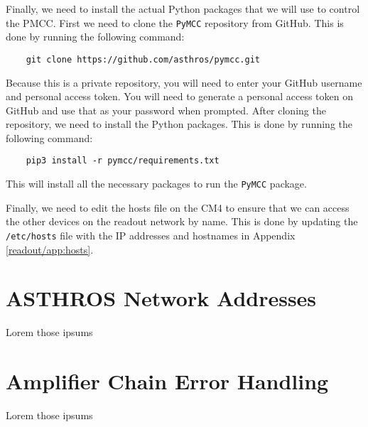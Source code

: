 Finally, we need to install the actual Python packages that we will use to control the PMCC.
First we need to clone the \texttt{PyMCC} repository from GitHub.
This is done by running the following command:
\begin{verbatim}
    git clone https://github.com/asthros/pymcc.git
\end{verbatim}
Because this is a private repository, you will need to enter your GitHub username and personal access token.
You will need to generate a personal access token on GitHub and use that as your password when prompted.
After cloning the repository, we need to install the Python packages.
This is done by running the following command:
\begin{verbatim}
    pip3 install -r pymcc/requirements.txt
\end{verbatim}
This will install all the necessary packages to run the \texttt{PyMCC} package.

Finally, we need to edit the hosts file on the CM4 to ensure that we can access the other devices on the readout network by name.
This is done by updating the \texttt{/etc/hosts} file with the IP addresses and hostnames in Appendix \ref{readout/app:hosts}.

\chapter{ASTHROS Network Addresses}
Lorem those ipsums
\label{readout/app:hosts}

\chapter{Amplifier Chain Error Handling}
Lorem those ipsums
\label{readout/app:if_amp_errors}